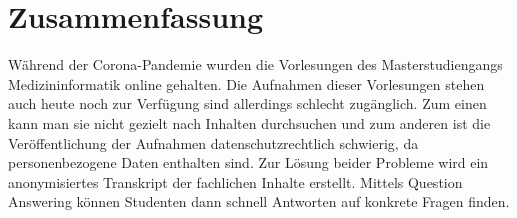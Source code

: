\chapter*{Zusammenfassung}



Während der Corona-Pandemie wurden die Vorlesungen des Masterstudiengangs Medizininformatik online gehalten. 
Die Aufnahmen dieser Vorlesungen stehen auch heute noch zur Verfügung sind allerdings schlecht zugänglich. 
Zum einen kann man sie nicht gezielt nach Inhalten durchsuchen und zum anderen ist die Veröffentlichung der Aufnahmen datenschutzrechtlich schwierig, da personenbezogene Daten enthalten sind. 
Zur Lösung beider Probleme wird ein anonymisiertes Transkript der fachlichen Inhalte erstellt. 
Mittels Question Answering können Studenten dann schnell Antworten auf konkrete Fragen finden. 

\vfill